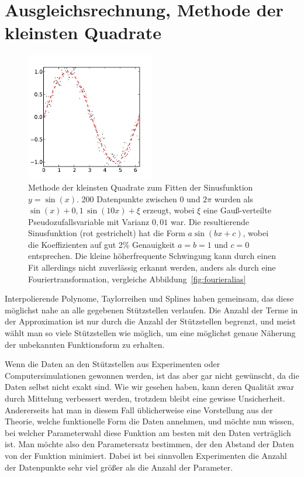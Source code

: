 \section{Ausgleichsrechnung, Methode der kleinsten Quadrate}

\begin{figure}
  \centering
  \includegraphics[width=0.5\textwidth]{plots/leastsq}
  \caption{Methode der kleinsten Quadrate zum Fitten der Sinusfunktion
    $y=\sin(x)$. 200 Datenpunkte zwischen 0 und $2\pi$ wurden als
    $\sin(x) + 0,1\,\sin(10 x) + \xi$ erzeugt, wobei $\xi$ eine
    Gauß-verteilte Pseudozufallsvariable mit Varianz $0,01$ war. Die
    resultierende Sinusfunktion (rot gestrichelt) hat die Form $a
    \sin(bx+c)$, wobei die Koeffizienten auf gut 2\% Genauigkeit
    $a=b=1$ und $c=0$ entsprechen. Die kleine höherfrequente
    Schwingung kann durch einen Fit allerdings nicht zuverlässig
    erkannt werden, anders als durch eine Fouriertransformation,
    vergleiche Abbildung~\ref{fig:fourieralias}}
  \label{fig:leastsq}
\end{figure}

Interpolierende Polynome, Taylorreihen und Splines haben gemeinsam,
das diese möglichst nahe an alle gegebenen Stützstellen verlaufen. Die
Anzahl der Terme in der Approximation ist nur durch die Anzahl der
Stützstellen begrenzt, und meist wählt man so viele Stützstellen wie
möglich, um eine möglichst genaue Näherung der unbekannten
Funktionsform zu erhalten.

Wenn die Daten an den Stützstellen aus Experimenten oder
Computersimulationen gewonnen werden, ist das aber gar nicht
gewünscht, da die Daten selbst nicht exakt sind. Wie wir gesehen
haben, kann deren Qualität zwar durch Mittelung verbessert werden,
trotzdem bleibt eine gewisse Unsicherheit.  Andererseits hat man in
diesem Fall üblicherweise eine Vorstellung aus der Theorie, welche
funktionelle Form die Daten annehmen, und möchte nun wissen, bei
welcher Parameterwahl diese Funktion am besten mit den Daten
verträglich ist. Man möchte also den Parametersatz bestimmen, der den
Abstand der Daten von der Funktion minimiert. Dabei ist bei sinnvollen
Experimenten die Anzahl der Datenpunkte sehr viel größer als die
Anzahl der Parameter.

